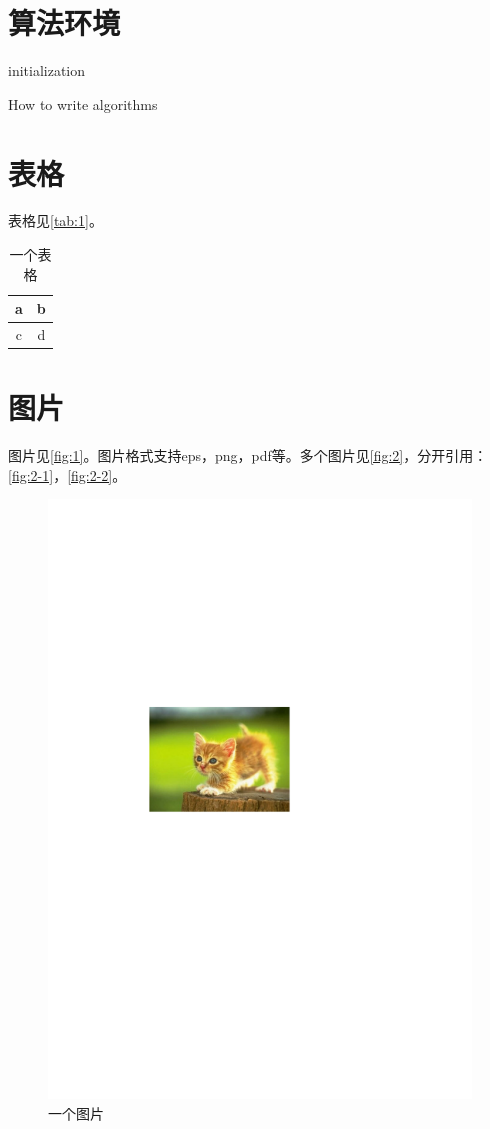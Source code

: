 \documentclass[format=draft,language=chinese,category=SDN]{hustreport}
\begin{document}
\section{算法环境}

\begin{algorithm}[H]
\SetAlgoLined
{}
initialization\;\label{alg_line:1}
\caption{How to write algorithms}\label{alg:1}
\end{algorithm}

\section{表格}
表格见\autoref{tab:1}。

\begin{table}[!h]
\centering
\caption{一个表格}\label{tab:1}
\begin{tabular}{|c|c|}
\hline
a & b \\
\hline
c & d \\
\hline
\end{tabular}
\end{table}
\section{图片}
图片见\autoref{fig:1}。图片格式支持eps，png，pdf等。多个图片见\autoref{fig:2}，分开引用：\autoref{fig:2-1}，\autoref{fig:2-2}。

\begin{figure}[!h]
\centering
\includegraphics[width=.4\textwidth]{fig/fig-example.pdf}
\caption{一个图片}\label{fig:1}
\end{figure}
\end{document}
